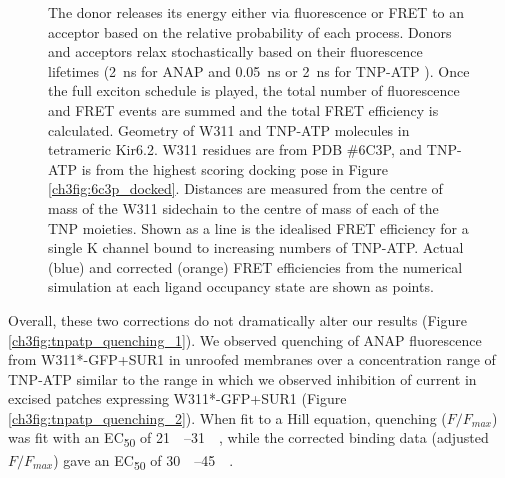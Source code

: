 \begin{figure}[hbtp]
{	The donor releases its energy either via fluorescence or FRET to an acceptor based on the relative probability of each process.
	Donors and acceptors relax stochastically based on their fluorescence lifetimes (\SI{2}{\nano\second} for ANAP \cite{zagotta_measuring_2016-1} and \SI{0.05}{\nano\second} or \SI{2}{\nano\second} for TNP-ATP \cite{ye_spectroscopic_1999, ishikawa_single-molecule_2002}).
	Once the full exciton schedule is played, the total number of fluorescence and FRET events are summed and the total FRET efficiency is calculated.
	 Geometry of W311 and TNP-ATP molecules in tetrameric Kir6.2.
	W311 residues are from PDB \#6C3P, and TNP-ATP is from the highest scoring docking pose in Figure \ref{ch3fig:6c3p_docked}.
	Distances are measured from the centre of mass of the W311 sidechain to the centre of mass of each of the TNP moieties.
	 Shown as a line is the idealised FRET efficiency for a single K\ATP{} channel bound to increasing numbers of TNP-ATP.
	Actual (blue) and corrected (orange) FRET efficiencies from the numerical simulation at each ligand occupancy state are shown as points.
	}
\end{figure}

Overall, these two corrections do not dramatically alter our results (Figure \ref{ch3fig:tnpatp_quenching_1}).
We observed quenching of ANAP fluorescence from W311*-GFP+SUR1 in unroofed membranes over a concentration range of TNP-ATP similar to the range in which we observed inhibition of current in excised patches expressing W311*-GFP+SUR1 (Figure \ref{ch3fig:tnpatp_quenching_2}).
When fit to a Hill equation, quenching ($F/F_{max}$) was fit with an EC\textsubscript{50} of \SIrange{21}{31}{\micro\Molar}, while the corrected binding data (adjusted $F/F_{max}$) gave an EC\textsubscript{50} of \SIrange{30}{45}{\micro\Molar}.

